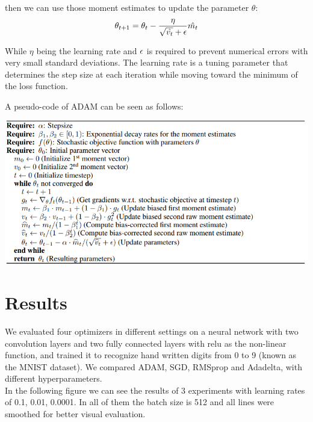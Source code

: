 \documentclass[10pt,a4paper]{article}
\begin{document}
then we can use those moment estimates to update the parameter $\theta$:
\begin{align*}
    \theta_{t+1}=\theta_t - \frac{\eta}{\sqrt{\hat{v_t}}+{\epsilon}}\hat{m_t}
\end{align*}

While $\eta$ being the learning rate and ${\epsilon}$ is required to prevent numerical errors with very small standard deviations. The learning rate is a tuning parameter that determines the step size at each iteration while moving toward the minimum of the loss function.


A pseudo-code of ADAM can be seen as follows:\\
\begin{center}
 \includegraphics[scale=0.4]{pseudocode.png}
\end{center}









\newpage
\section{Results}

We evaluated four optimizers in different settings on a neural network with two convolution layers and two fully connected layers with relu as the non-linear function, and trained it to recognize hand written digits from 0 to 9 (known as the MNIST dataset). We compared ADAM, SGD, RMSprop and Adadelta, with different hyperparameters.\\

In the following figure we can see the results of 3 experiments with learning rates of 0.1, 0.01, 0.0001. In all of them the batch size is 512 and all lines were smoothed for better visual evaluation.
\end{document}
